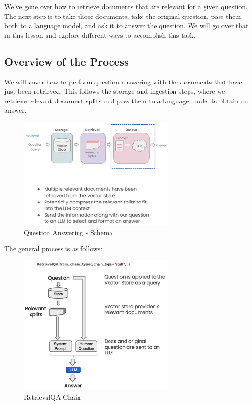 \documentclass{article}
\begin{document}
We've gone over how to retrieve documents that are relevant for a given question. The next step is to take those documents, take the original question, pass them both to a language model, and ask it to answer the question. We will go over that in this lesson and explore different ways to accomplish this task.

\subsection{Overview of the Process}

We will cover how to perform question answering with the documents that have just been retrieved. This follows the storage and ingestion steps, where we retrieve relevant document splits and pass them to a language model to obtain an answer.

\begin{figure}[H]
    \centering
    \includegraphics[width=0.7\textwidth]{images/langchain_chat_with_your_data_017.png}
    \caption{Question Answering - Schema}
    \label{fig:question_answering_schema}
\end{figure}

The general process is as follows:

\begin{figure}[H]
    \centering
    \includegraphics[width=0.7\textwidth]{images/langchain_chat_with_your_data_018.png}
    \caption{RetrievalQA Chain}
    \label{fig:retrievalqa_chain}
\end{figure}
\end{document}
